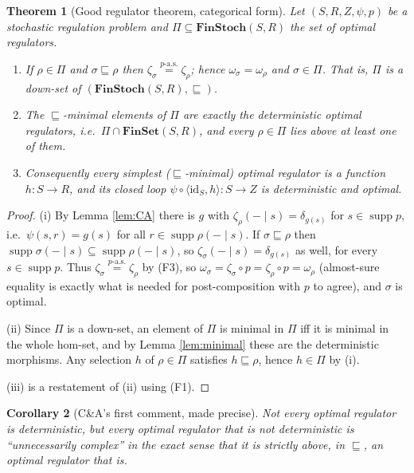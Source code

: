 \documentclass[11pt,a4paper]{article}
\newtheorem{theorem}{Theorem}[section]
\newtheorem{corollary}[theorem]{Corollary}
\theoremstyle{definition}
\theoremstyle{remark}
\newcommand{\FinSet}{\mathbf{FinSet}}
\newcommand{\FinStoch}{\mathbf{FinStoch}}
\newcommand{\id}{\mathrm{id}}
\newcommand{\supp}{\operatorname{supp}}
\newcommand{\aseq}[1]{\overset{#1\text{-a.s.}}{=}}
\newcommand{\refines}{\sqsubseteq}
\newcommand{\pair}[2]{\langle #1,#2\rangle}
\begin{document}
\begin{theorem}[Good regulator theorem, categorical form]\label{thm:main}
Let $(S,R,Z,\psi,p)$ be a stochastic regulation problem and $\Pi\subseteq\FinStoch(S,R)$ the set of optimal regulators.
\begin{enumerate}[label=(\roman*)]
\item If $\rho\in\Pi$ and $\sigma\refines\rho$ then $\zeta_\sigma\aseq{p}\zeta_\rho$; hence $\omega_\sigma=\omega_\rho$ and $\sigma\in\Pi$. That is, \emph{$\Pi$ is a down-set of $(\FinStoch(S,R),\refines)$}.
\item The $\refines$-minimal elements of $\Pi$ are exactly the deterministic optimal regulators, i.e.\ $\Pi\cap\FinSet(S,R)$, and every $\rho\in\Pi$ lies above at least one of them.
\item Consequently every simplest ($\refines$-minimal) optimal regulator is a function $h\colon S\to R$, and its closed loop $\psi\circ\pair{\id_S}{h}\colon S\to Z$ is deterministic and optimal.
\end{enumerate}
\end{theorem}
\begin{proof}
(i) By Lemma \ref{lem:CA} there is $g$ with $\zeta_\rho(-\mid s)=\delta_{g(s)}$ for $s\in\supp p$, i.e.\ $\psi(s,r)=g(s)$ for all $r\in\supp\rho(-\mid s)$. If $\sigma\refines\rho$ then $\supp\sigma(-\mid s)\subseteq\supp\rho(-\mid s)$, so $\zeta_\sigma(-\mid s)=\delta_{g(s)}$ as well, for every $s\in\supp p$. Thus $\zeta_\sigma\aseq{p}\zeta_\rho$ by (F3), so $\omega_\sigma=\zeta_\sigma\circ p=\zeta_\rho\circ p=\omega_\rho$ (almost-sure equality is exactly what is needed for post-composition with $p$ to agree), and $\sigma$ is optimal.

(ii) Since $\Pi$ is a down-set, an element of $\Pi$ is minimal in $\Pi$ iff it is minimal in the whole hom-set, and by Lemma \ref{lem:minimal} these are the deterministic morphisms. Any selection $h$ of $\rho\in\Pi$ satisfies $h\refines\rho$, hence $h\in\Pi$ by (i).

(iii) is a restatement of (ii) using (F1).
\end{proof}

\begin{corollary}[C\&A's first comment, made precise]
Not every optimal regulator is deterministic, but every optimal regulator that is not deterministic is ``unnecessarily complex'' in the exact sense that it is strictly above, in $\refines$, an optimal regulator that is.
\end{corollary}
\end{document}
